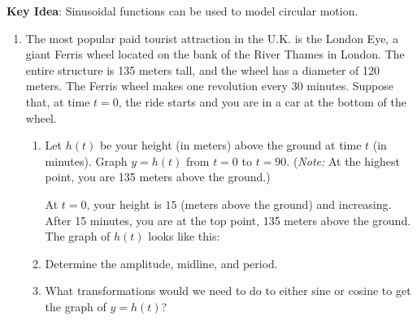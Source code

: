 \documentclass[main]{subfiles}
\begin{document}
\newpage

\textbf{Key Idea}: Sinusoidal functions can be used to model circular motion.

\begin{enumerate}[resume]

\item 

  The most popular paid tourist attraction in the U.K. is the London Eye,
  a giant Ferris wheel located on the bank of the River Thames in London.
  The entire structure is 135 meters tall, and the wheel has a diameter of
  120 meters.  The Ferris wheel makes one revolution every 30 minutes.
  Suppose that, at time $t = 0$, the ride starts and you are in a car at
  the bottom of the wheel.

  \begin{enumerate}
  \item
    \begin{problem}[\stretch{2}]
      Let $h(t)$ be your height (in meters) above the ground at time $t$ (in minutes). 
      Graph $y=h(t)$ from $t=0$ to $t=90$. (\emph{Note:}
      At the highest point, you are 135 meters above the ground.)
    \end{problem}

    \begin{solution}
      At $t = 0$, your height is $15$ (meters above the ground) and
    increasing.  After 15 minutes, you are at the top point, 135 meters
    above the ground.  The graph of $h(t)$ looks like this:
    \begin{center}
    \end{center}
    \end{solution}

    \item 
    \begin{problem}
        Determine the amplitude, midline, and period.
    \end{problem}
    \pspace{\vfill}

    \item 
    \begin{problem}
        What transformations would we need to do to either sine or cosine to get the graph of $y=h(t)$?
    \end{problem}
    \pspace{\vfill}
    

\end{enumerate}
\end{enumerate}
\end{document}
